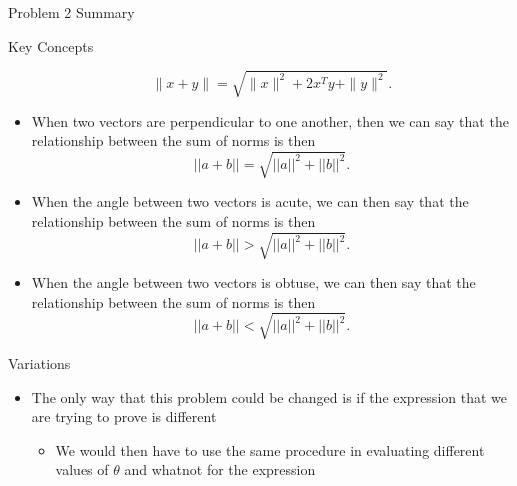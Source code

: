 \begin{summary}{Problem 2 Summary}
\begin{statement}{Key Concepts}
\begin{itemize}
\begin{equation*}
                \|x + y\| = \sqrt{\|x\|^{2} + 2x^{T}y + \|y\|^{2}}.
            \end{equation*}
            \item When two vectors are perpendicular to one another, then we can say that the relationship between the sum of norms is then
            \begin{equation*}
                ||a+b|| = \sqrt{||a||^{2} + ||b||^{2}}.
            \end{equation*}
            \item When the angle between two vectors is acute, we can then say that the relationship between the sum of norms is then
            \begin{equation*}
                ||a + b|| > \sqrt{||a||^{2} + ||b||^{2}}.
            \end{equation*}
            \item When the angle between two vectors is obtuse, we can then say that the relationship between the sum of norms is then
            \begin{equation*}
                ||a + b|| < \sqrt{||a||^{2} + ||b||^{2}}.
            \end{equation*}
        \end{itemize}
    \end{statement}
    \begin{statement}{Variations}
        \begin{itemize}
            \item The only way that this problem could be changed is if the expression that we are trying to prove is different
            \begin{itemize}
                \item We would then have to use the same procedure in evaluating different values of $\theta$ and whatnot for the expression
            \end{itemize}
        \end{itemize}
    \end{statement}
\end{summary}

